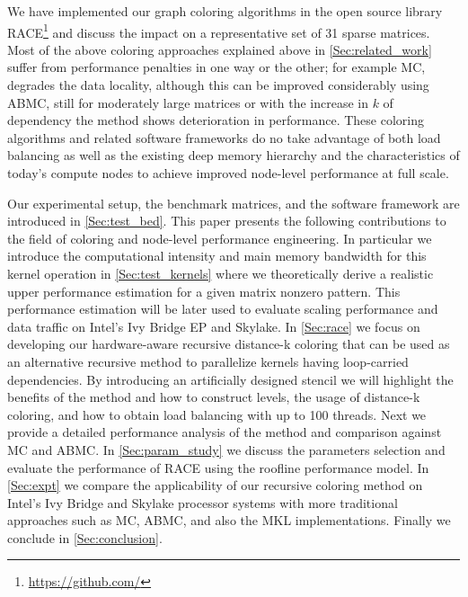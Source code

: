 
We have implemented our graph coloring algorithms in the open source library \acrfull{RACE}\footnote{\href{https://github.com/}{https://github.com/}} and discuss the impact on a representative set of 31 sparse matrices. Most of the above coloring approaches explained above in \cref{Sec:related_work} suffer from performance penalties in one way or the other; for example \acrshort{MC}, degrades the data locality, although this can be improved considerably using \acrshort{ABMC}, still for moderately large matrices or with the increase in $k$ of \DK dependency the method shows deterioration in performance. 
These coloring algorithms and related software frameworks do no take advantage of both load balancing as well as the existing deep memory hierarchy and the characteristics of today’s compute nodes to achieve improved node-level performance at full scale.

Our experimental setup, the benchmark matrices, and the software framework are introduced in \cref{Sec:test_bed}.
This paper presents the following contributions to the field of coloring and node-level performance engineering. In particular we introduce the computational intensity and main memory bandwidth for this kernel operation in \cref{Sec:test_kernels} where we theoretically derive a realistic upper performance estimation for a given matrix nonzero pattern.  This performance estimation will be later used to evaluate scaling performance and data traffic on Intel's Ivy Bridge EP and Skylake. In \cref{Sec:race} we focus on developing our hardware-aware recursive distance-k coloring that can be used as an alternative recursive method to parallelize kernels having loop-carried dependencies. By introducing an artificially designed stencil we will highlight the benefits of the method and how to construct levels, the usage of distance-k coloring, and how to obtain load balancing with up to 100 threads. Next we provide a detailed performance analysis of the method and comparison against \acrshort{MC} and \acrshort{ABMC}. In \cref{Sec:param_study} we discuss the parameters selection and evaluate the performance of \acrshort{RACE} using the roofline performance model. In \cref{Sec:expt} we compare the applicability of our recursive coloring method on Intel’s Ivy Bridge and Skylake processor systems with more traditional approaches such as  \acrshort{MC}, \acrshort{ABMC}, and also the \acrshort{MKL} implementations. Finally we conclude in 
\cref{Sec:conclusion}.



